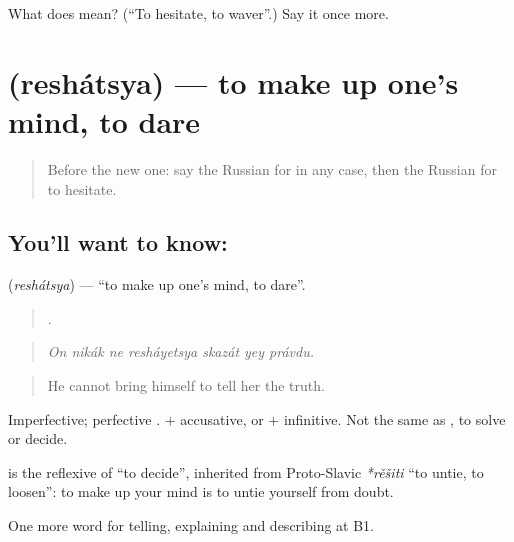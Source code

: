 \begin{tcolorbox}[breakable,colback=teal!4,colframe=teal!35!black,title={Before you move on}]
What does  mean? (\textquotedblleft{}To hesitate, to waver\textquotedblright{}.) Say it once more.
\end{tcolorbox}
\section[\texorpdfstring{\ru{решаться} (reshátsya)}{решаться (reshátsya)}]{ (reshátsya) — to make up one’s mind, to dare}

\label{lesson:RU-C379-reshatsya}



\begin{quote}
Before the new one: say the Russian for in any case, then the Russian for to hesitate.
\end{quote}

\subsection*{You'll want to know: }
\textbf{} (\emph{reshátsya}) — \textquotedblleft{}to make up one’s mind, to dare\textquotedblright{}.

\begin{quote}
      .
\end{quote}

\begin{quote}
\emph{On nikák ne resháyetsya skazát yey právdu.}
\end{quote}

\begin{quote}
He cannot bring himself to tell her the truth.
\end{quote}

Imperfective; perfective \emph{}. \emph{ } + accusative, or + infinitive. Not the same as \emph{}, to solve or decide.

\begin{cousinweb}
\textbf{} is the reflexive of \emph{} \textquotedblleft{}to decide\textquotedblright{}, inherited from Proto-Slavic \emph{*rěšiti} \textquotedblleft{}to untie, to loosen\textquotedblright{}: to make up your mind is to untie yourself from doubt.
\end{cousinweb}

\begin{grammarlens}[title={What you've built}]
One more word for telling, explaining and describing at B1.
\end{grammarlens}

